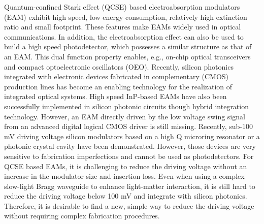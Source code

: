 \documentclass[aip,apl,reprint,a4paper]{revtex4-1}
\begin{document}

\maketitle %


Quantum-confined Stark effect (QCSE) based electroabsorption modulators (EAM) exhibit high speed, low energy consumption, relatively high extinction ratio and small footprint.\cite{Yong40,Fukano} These features make EAMs widely used in optical communications. In addition, the electroabsorption effect can also be used to build a high speed photodetector, which possesses a similar structure as that of an EAM.\cite{Welstand} This dual function property enables, e.g., on-chip optical transceivers \cite{Transceiver} and compact optoelectronic oscillators (OEO).\cite{Zhou} Recently, silicon photonics integrated with electronic devices fabricated in complementary (CMOS) production lines has become an enabling technology for the realization of integrated optical systems.\cite{Marpaung,Sun} High speed InP-based EAMs have also been successfully implemented in silicon photonic circuits though hybrid integration technology.\cite{Yong40,Transceiver,roelkensiii-v-on-silicon2015,fu52015} However, an EAM directly driven by the low voltage swing signal from an advanced digital logical CMOS driver is still missing. Recently, sub-100 mV driving voltage silicon modulators based on a high Q microring resonator or a photonic crystal cavity have been demonstrated.\cite{Manipatruni,Shakoor:14} However, those devices are very sensitive to fabrication imperfections and cannot be used as photodetectors. For QCSE based EAMs, it is challenging to reduce the driving voltage without an increase in the modulator size and insertion loss. Even when using a complex slow-light Bragg waveguide to enhance light-matter interaction, it is still hard to reduce the driving voltage below 100 mV and integrate with silicon photonics.\cite{gulow-voltage2013} Therefore, it is desirable to find a new, simple way to reduce the driving voltage without requiring complex fabrication procedures.
\end{document}
